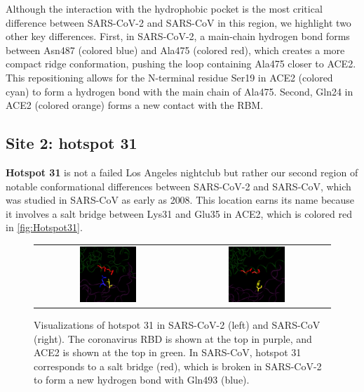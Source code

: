 Although the interaction with the hydrophobic pocket is the most critical difference between SARS-CoV-2 and SARS-CoV in this region, we highlight two other key differences. First, in SARS-CoV-2, a main-chain hydrogen bond forms between Asn487 (colored blue) and Ala475 (colored red), which creates a more compact ridge conformation, pushing the loop containing Ala475 closer to ACE2. This repositioning allows for the N-terminal residue Ser19 in ACE2 (colored cyan) to form a hydrogen bond with the main chain of Ala475. Second, Gln24 in ACE2 (colored orange) forms a new contact with the RBM.

\FloatBarrier
{}
\subsection{Site 2: hotspot 31}

\textbf{Hotspot 31} is not a failed Los Angeles nightclub but rather our second region of notable conformational differences between SARS-CoV-2 and SARS-CoV, which was studied in SARS-CoV as early as 2008. This location earns its name because it involves a salt bridge between Lys31 and Glu35 in ACE2, which is colored red in \autoref{fig:Hotspot31}.\\

\begin{figure}[h]
	\centering
	\mySfFamily
	\begin{tabular}{c c}
	\includegraphics[width = 0.4\textwidth]{../images/Hotspot31_SARS-2.png} & \includegraphics[width = 0.4\textwidth]{../images/Hotspot31_SARS.png}
	\end{tabular}
	\caption{Visualizations of hotspot 31 in SARS-CoV-2 (left) and SARS-CoV (right). The coronavirus RBD is shown at the top in purple, and ACE2 is shown at the top in green. In SARS-CoV, hotspot 31 corresponds to a salt bridge (red), which is broken in SARS-CoV-2 to form a new hydrogen bond with Gln493 (blue).}
	\label{fig:Hotspot31}
\end{figure}

